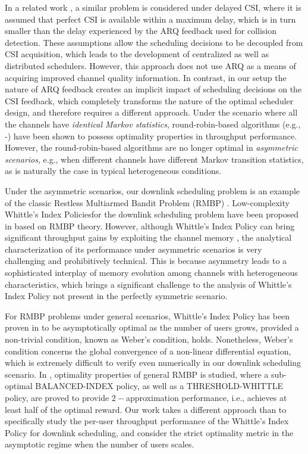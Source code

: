\documentclass[11pt,twocolumn]{IEEEtran}
\begin{document}
In a related work \cite{YingShakkottai}, a similar problem is
considered under delayed CSI, where it is assumed that
perfect CSI is available within a maximum delay, which is in turn smaller than the delay experienced by the ARQ feedback used for collision detection. These assumptions allow  the scheduling decisions to be
decoupled from CSI acquisition, which leads to the
development of centralized as well as distributed
schedulers. However, this approach does not use ARQ as a means of acquiring improved channel quality information. In contrast, in our setup the nature of ARQ feedback creates an implicit impact of scheduling
decisions on the CSI feedback, which completely transforms the nature of
the optimal scheduler design, and therefore requires a different
approach. Under the scenario where all the channels have
\emph{identical Markov statistics},
round-robin-based algorithms (e.g., \cite{Liu}-\cite{Neely_utility}) have
been shown to possess optimality properties in throughput performance.
However, the round-robin-based algorithms are no longer optimal in
\emph{asymmetric scenarios}, e.g., when different channels have different
Markov transition statistics, as is naturally the case in typical
heterogeneous conditions.



Under the asymmetric scenarios, our downlink scheduling problem is an example of the classic Restless Multiarmed Bandit Problem
(RMBP) \cite{Whittle}. Low-complexity Whittle's Index Policies\hspace{3pt}\cite{Whittle}\hspace{3pt}for the downlink scheduling problem have been
proposed in \cite{Zhao_index}\cite{Infocom11} based on RMBP theory.
However, although Whittle's Index Policy can bring significant
throughput gains by exploiting the channel memory \cite{Infocom11},
the analytical characterization of its performance under asymmetric
scenarios is very challenging and prohibitively technical. This is because asymmetry leads to a sophisticated interplay of memory evolution among channels with heterogeneous characteristics, which brings a significant challenge to the analysis of Whittle's Index Policy not present in the perfectly symmetric scenario. 



For RMBP problems under general scenarios, Whittle's Index Policy has been proven in \cite{Weber} to be asymptotically optimal
as the number of users grows, provided a non-trivial condition,
known as Weber's condition, holds. Nonetheless, Weber's condition
concerns the global convergence of a non-linear differential
equation, which is extremely difficult to verify even
numerically in our downlink scheduling scenario. In \cite{ApproxRMBP}, optimality properties of general RMBP is studied, where a sub-optimal BALANCED-INDEX policy, as well as a THRESHOLD-WHITTLE policy, are proved to provide $2-$approximation performance, i.e., achieves at least half of the optimal reward. Our work takes a different approach than \cite{ApproxRMBP} to specifically study the per-user throughput performance of the Whittle's Index Policy for downlink scheduling, and consider the strict optimality metric in the asymptotic regime when the number of users scales. 
\end{document}

